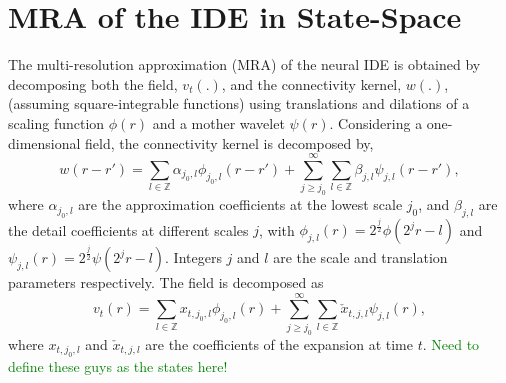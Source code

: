 \documentclass[journal,a4paper]{IEEEtran}
\newcommand{\dean}[1]{\textcolor{green}{#1}}
\begin{document}
\section{MRA of the IDE in State-Space}
The multi-resolution approximation (MRA) of the neural IDE is obtained by decomposing both the field, $v_t(.)$, and the connectivity kernel, $w(.)$, (assuming square-integrable functions) using translations and dilations of a scaling function $\phi(r)$ and a mother wavelet $\psi(r)$. Considering a one-dimensional field, the connectivity kernel is decomposed by,
\begin{equation}
 w\left(r-r'\right)=\sum_{l \in \mathbb{Z}}\alpha_{j_0,l}\phi_{j_0,l}\left(r-r'\right)+\sum_{j\geq j_0}^{\infty} \sum_{l \in \mathbb{Z}}\beta_{j,l}\psi_{j,l}\left(r-r'\right), 
\label{eq:KernelExpansion}
\end{equation}
where $\alpha_{j_0,l}$ are the approximation coefficients at the lowest scale $j_0$, and $\beta_{j,l}$ are the detail coefficients at different scales $j$, with $\phi_{j,l}\left(r\right)=2^{\frac{j}{2}}\phi\left(2^jr-l\right) $ and $\psi_{j,l}\left(r\right)=2^{\frac{j}{2}}\psi\left(2^jr-l\right)$. Integers $j$ and $l$ are the scale and translation parameters respectively. The field is decomposed as
\begin{equation}
 v_t\left(r\right)=\sum_{l \in \mathbb{Z}}x_{t,j_{0},l}\phi_{j_{0},l}\left(r\right)+\sum_{j\geq j_0}^{\infty} \sum_{l \in \mathbb{Z}} \check{x}_{t,j,l}\psi_{j,l}\left(r\right),
\label{eq:FieldExpansion}
\end{equation}
where $x_{t,j_{0},l}$ and $\check{x}_{t,j,l} $ are the coefficients of the expansion at time $t$. \dean{Need to define these guys as the states here!}
\end{document}
